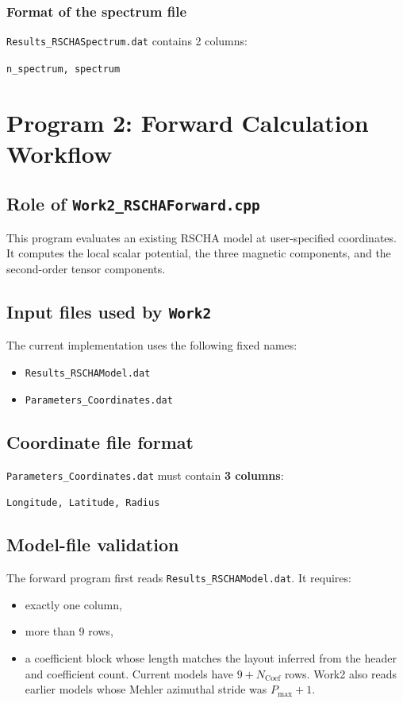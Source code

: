 \documentclass[11pt,a4paper]{article}
\begin{document}
\subsubsection{Format of the spectrum file}

\texttt{Results\_RSCHASpectrum.dat} contains 2 columns:
\begin{center}
\texttt{n\_spectrum, spectrum}
\end{center}

\section{Program 2: Forward Calculation Workflow}

\subsection{Role of \texttt{Work2\_RSCHAForward.cpp}}

This program evaluates an existing RSCHA model at user-specified coordinates. It computes the local scalar potential, the three magnetic components, and the second-order tensor components.

\subsection{Input files used by \texttt{Work2}}

The current implementation uses the following fixed names:
\begin{itemize}
  \item \texttt{Results\_RSCHAModel.dat}
  \item \texttt{Parameters\_Coordinates.dat}
\end{itemize}

\subsection{Coordinate file format}

\texttt{Parameters\_Coordinates.dat} must contain \textbf{3 columns}:
\begin{center}
\texttt{Longitude, Latitude, Radius}
\end{center}

\subsection{Model-file validation}

The forward program first reads \texttt{Results\_RSCHAModel.dat}. It requires:
\begin{itemize}
  \item exactly one column,
  \item more than 9 rows,
  \item a coefficient block whose length matches the layout inferred from the
  header and coefficient count. Current models have $9+N_{\mathrm{Coef}}$
  rows. Work2 also reads earlier models whose Mehler azimuthal stride was
  $P_{\max}+1$.
\end{itemize}
\end{document}
